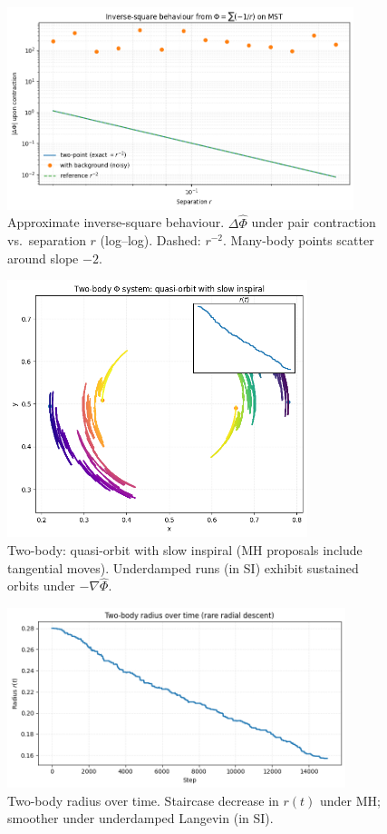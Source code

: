 \documentclass[aps,preprint,onecolumn,longbibliography,nofootinbib]{revtex4-2}
\numberwithin{equation}{section}        %
\begin{document}
\begin{figure}[H]
\centering
\includegraphics[width=0.9\textwidth]{inverse_square.png}
\caption{Approximate inverse-square behaviour. $\Delta \widehat\Phi$ under pair contraction vs.\ separation $r$ (log--log). Dashed: $r^{-2}$. Many-body points scatter around slope $-2$.}
\label{fig:inverse}
\end{figure}

\begin{figure}[H]
\centering
\includegraphics[width=0.78\textwidth]{orbit_two_body.png}
\caption{Two-body: quasi-orbit with slow inspiral (MH proposals include tangential moves). Underdamped runs (in SI) exhibit sustained orbits under $-\nabla\widehat\Phi$.}
\label{fig:twoorbit}
\end{figure}

\begin{figure}[H]
\centering
\includegraphics[width=0.88\textwidth]{two_body_r_vs_t.png}
\caption{Two-body radius over time. Staircase decrease in $r(t)$ under MH; smoother under underdamped Langevin (in SI).}
\label{fig:tworadius}
\end{figure}
\end{document}
